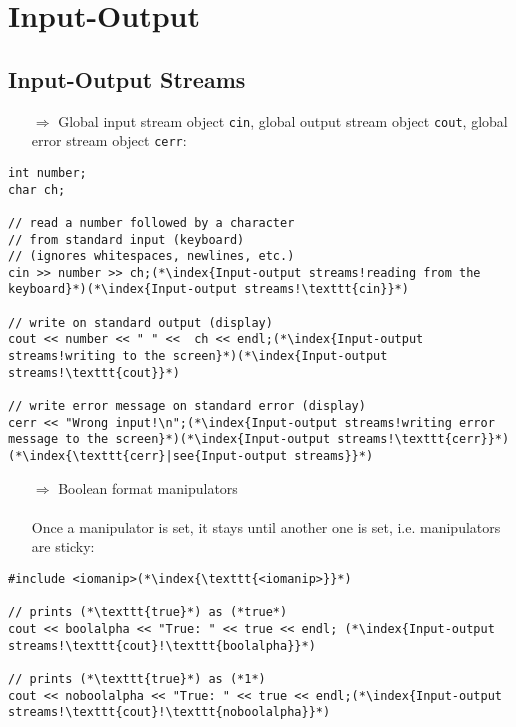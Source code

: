 \documentclass[10pt]{book}
\begin{document}
\chapter{Input-Output}
%
%
\section{Input-Output Streams}
\begin{enumerate}
\item[$\Rightarrow$] Global  input stream object \texttt{cin}, global output stream object \texttt{cout}, global error stream object \texttt{cerr}:
\end{enumerate}
\begin{lstlisting}
int number;
char ch;

// read a number followed by a character
// from standard input (keyboard)
// (ignores whitespaces, newlines, etc.)
cin >> number >> ch;(*\index{Input-output streams!reading from the keyboard}*)(*\index{Input-output streams!\texttt{cin}}*)

// write on standard output (display)
cout << number << " " <<  ch << endl;(*\index{Input-output streams!writing to the screen}*)(*\index{Input-output streams!\texttt{cout}}*)

// write error message on standard error (display)
cerr << "Wrong input!\n";(*\index{Input-output streams!writing error message to the screen}*)(*\index{Input-output streams!\texttt{cerr}}*)(*\index{\texttt{cerr}|see{Input-output streams}}*)
\end{lstlisting}
\begin{enumerate}
\item[$\Rightarrow$] Boolean format manipulators\\ \\ Once a  manipulator is set, it stays until another one is set, i.e. manipulators are sticky:
\end{enumerate}
\begin{lstlisting}
#include <iomanip>(*\index{\texttt{<iomanip>}}*)

// prints (*\texttt{true}*) as (*true*)
cout << boolalpha << "True: " << true << endl; (*\index{Input-output streams!\texttt{cout}!\texttt{boolalpha}}*)

// prints (*\texttt{true}*) as (*1*)
cout << noboolalpha << "True: " << true << endl;(*\index{Input-output streams!\texttt{cout}!\texttt{noboolalpha}}*)
\end{lstlisting}
\end{document}
